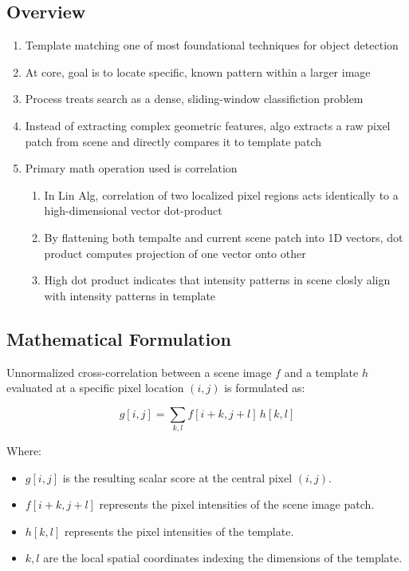 \documentclass[12pt]{article}
\begin{document}
\subsection{Overview}
\begin{enumerate}
    \item Template matching one of most foundational techniques for object detection
    \item At core, goal is to locate specific, known pattern within a larger image
    \item Process treats search as a dense, sliding-window classifiction problem
    \item Instead of extracting complex geometric features, algo extracts a raw pixel patch from scene and directly compares it to template patch
    \item Primary math operation used is correlation
          \begin{enumerate}
              \item In Lin Alg, correlation of two localized pixel regions acts identically to a high-dimensional vector dot-product
              \item By flattening both tempalte and current scene patch into 1D vectors, dot product computes projection of one vector onto other
              \item High dot product indicates that intensity patterns in scene closly align with intensity patterns in template
          \end{enumerate}
\end{enumerate}

\subsection{Mathematical Formulation}

Unnormalized cross-correlation between a scene image $f$ and a template $h$ evaluated at a specific pixel location $(i,j)$ is formulated as:

\[
    g[i,j] = \sum_{k,l} f[i+k, j+l] \, h[k,l]
\]

Where:
\begin{itemize}
    \item $g[i,j]$ is the resulting scalar score at the central pixel $(i,j)$.
    \item $f[i+k, j+l]$ represents the pixel intensities of the scene image patch.
    \item $h[k,l]$ represents the pixel intensities of the template.
    \item $k,l$ are the local spatial coordinates indexing the dimensions of the template.
\end{itemize}
\end{document}
